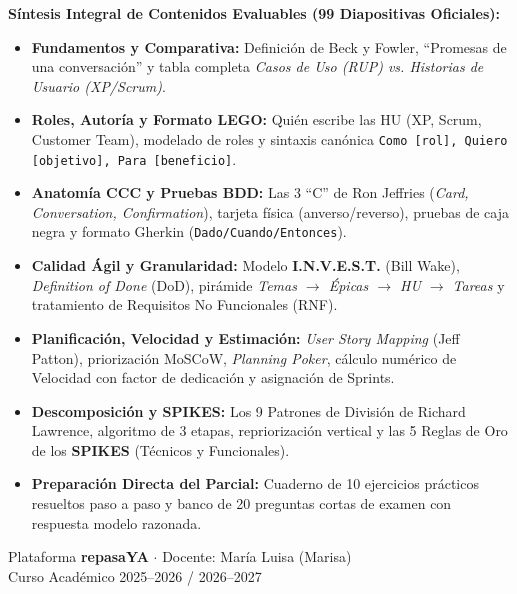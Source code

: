 \documentclass[11pt,a4paper,twoside,openany]{report}
\begin{document}
\begin{titlepage}
    \begin{tcolorbox}[
        colback=mdaLightAccent,
        colframe=mdaAccent,
        width=0.90\textwidth,
        arc=4pt,
        boxrule=1pt,
        halign=center
    ]
        \large\textbf{\color{mdaDarkBlue}Síntesis Integral de Contenidos Evaluables (99 Diapositivas Oficiales):}\\[8pt]
        \normalsize
        \begin{itemize}[leftmargin=1.5cm, rightmargin=1cm, itemsep=3pt]
            \item[\textbf{1.}] \textbf{Fundamentos y Comparativa:} Definición de Beck y Fowler, ``Promesas de una conversación'' y tabla completa \textit{Casos de Uso (RUP) vs. Historias de Usuario (XP/Scrum)}.
            \item[\textbf{2.}] \textbf{Roles, Autoría y Formato LEGO:} Quién escribe las HU (XP, Scrum, Customer Team), modelado de roles y sintaxis canónica \texttt{Como [rol], Quiero [objetivo], Para [beneficio]}.
            \item[\textbf{3.}] \textbf{Anatomía CCC y Pruebas BDD:} Las 3 ``C'' de Ron Jeffries (\textit{Card, Conversation, Confirmation}), tarjeta física (anverso/reverso), pruebas de caja negra y formato Gherkin (\texttt{Dado/Cuando/Entonces}).
            \item[\textbf{4.}] \textbf{Calidad Ágil y Granularidad:} Modelo \textbf{I.N.V.E.S.T.} (Bill Wake), \textit{Definition of Done} (DoD), pirámide \textit{Temas $\to$ Épicas $\to$ HU $\to$ Tareas} y tratamiento de Requisitos No Funcionales (RNF).
            \item[\textbf{5.}] \textbf{Planificación, Velocidad y Estimación:} \textit{User Story Mapping} (Jeff Patton), priorización MoSCoW, \textit{Planning Poker}, cálculo numérico de Velocidad con factor de dedicación y asignación de Sprints.
            \item[\textbf{6.}] \textbf{Descomposición y SPIKES:} Los 9 Patrones de División de Richard Lawrence, algoritmo de 3 etapas, repriorización vertical y las 5 Reglas de Oro de los \textbf{SPIKES} (Técnicos y Funcionales).
            \item[\textbf{7.}] \textbf{Preparación Directa del Parcial:} Cuaderno de 10 ejercicios prácticos resueltos paso a paso y banco de 20 preguntas cortas de examen con respuesta modelo razonada.
        \end{itemize}
    \end{tcolorbox}
    
    \vfill
    
    {\large\textsf{Plataforma \textbf{repasaYA} $\cdot$ Docente: María Luisa (Marisa)}}\\[0.2cm]
    {\small\textsf{Curso Académico 2025--2026 / 2026--2027}}\\[0.5cm]
\end{titlepage}
\end{document}
